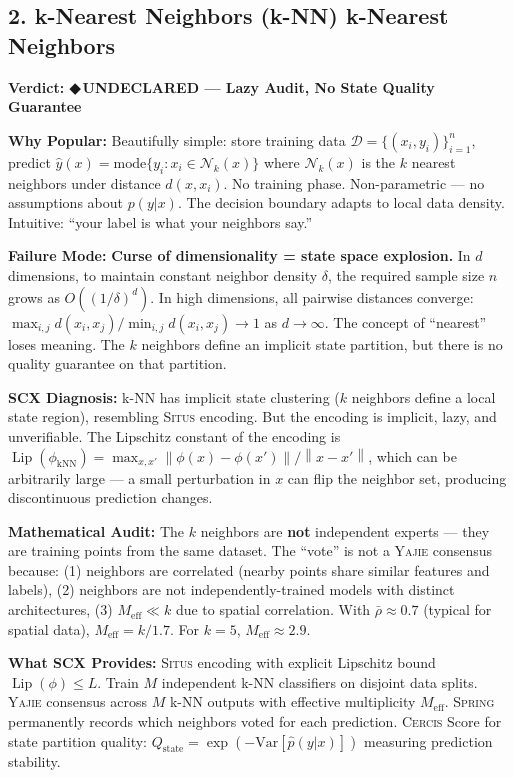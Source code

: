 \documentclass[12pt,a4paper]{article}
\theoremstyle{definition}
\newcommand{\guilty}{{\color{guiltycolor}\textbf{◆\,UNDECLARED}}}
\newcommand{\Situs}{\textsc{Situs}}
\newcommand{\Yajie}{\textsc{Yajie}}
\newcommand{\Spring}{\textsc{Spring}}
\newcommand{\Cercis}{\textsc{Cercis}}
\DeclareMathOperator{\Lip}{Lip}
\newcommand{\cD}{\mathcal{D}}
\newcommand{\cN}{\mathcal{N}}
\newcommand{\norm}[1]{\left\lVert#1\right\rVert}
\newcommand{\auditHeader}[1]{\medskip\noindent\textbf{\large #1}\medskip}
\newcommand{\whyPopular}{\noindent\textbf{Why Popular:} }
\newcommand{\whyFail}{\noindent\textbf{Failure Mode:} }
\newcommand{\whatMissing}{\noindent\textbf{What SCX Provides:} }
\newcommand{\diagnosis}{\noindent\textbf{SCX Diagnosis:} }
\newcommand{\mathAudit}{\noindent\textbf{Mathematical Audit:} }
\begin{document}
\subsection{2. k-Nearest Neighbors (k-NN) k-Nearest Neighbors}

\auditHeader{Verdict: \guilty{} — Lazy Audit, No State Quality Guarantee}

\whyPopular{} Beautifully simple: store training data $\cD = \{(x_i, y_i)\}_{i=1}^n$, predict $\hat{y}(x) = \text{mode}\{y_i : x_i \in \cN_k(x)\}$ where $\cN_k(x)$ is the $k$ nearest neighbors under distance $d(x, x_i)$. No training phase. Non-parametric — no assumptions about $p(y|x)$. The decision boundary adapts to local data density. Intuitive: ``your label is what your neighbors say.''

\whyFail{} \textbf{Curse of dimensionality = state space explosion.} In $d$ dimensions, to maintain constant neighbor density $\delta$, the required sample size $n$ grows as $O((1/\delta)^d)$. In high dimensions, all pairwise distances converge: $\max_{i,j} d(x_i, x_j) / \min_{i,j} d(x_i, x_j) \to 1$ as $d \to \infty$. The concept of ``nearest'' loses meaning. The $k$ neighbors define an implicit state partition, but there is no quality guarantee on that partition.

\diagnosis{} k-NN has implicit state clustering ($k$ neighbors define a local state region), resembling \Situs{} encoding. But the encoding is implicit, lazy, and unverifiable. The Lipschitz constant of the encoding is $\Lip(\phi_{\text{kNN}}) = \max_{x,x'} \norm{\phi(x) - \phi(x')} / \norm{x - x'}$, which can be arbitrarily large — a small perturbation in $x$ can flip the neighbor set, producing discontinuous prediction changes.

\mathAudit{} The $k$ neighbors are \textbf{not} independent experts — they are training points from the same dataset. The ``vote'' is not a \Yajie{} consensus because: (1) neighbors are correlated (nearby points share similar features and labels), (2) neighbors are not independently-trained models with distinct architectures, (3) $M_{\text{eff}} \ll k$ due to spatial correlation. With $\bar{\rho} \approx 0.7$ (typical for spatial data), $M_{\text{eff}} = k/1.7$. For $k=5$, $M_{\text{eff}} \approx 2.9$.

\whatMissing{} \Situs{} encoding with explicit Lipschitz bound $\Lip(\phi) \le L$. Train $M$ independent k-NN classifiers on disjoint data splits. \Yajie{} consensus across $M$ k-NN outputs with effective multiplicity $M_{\text{eff}}$. \Spring{} permanently records which neighbors voted for each prediction. \Cercis{} Score for state partition quality: $Q_{\text{state}} = \exp(-\text{Var}[\hat{p}(y|x)])$ measuring prediction stability.
\end{document}

